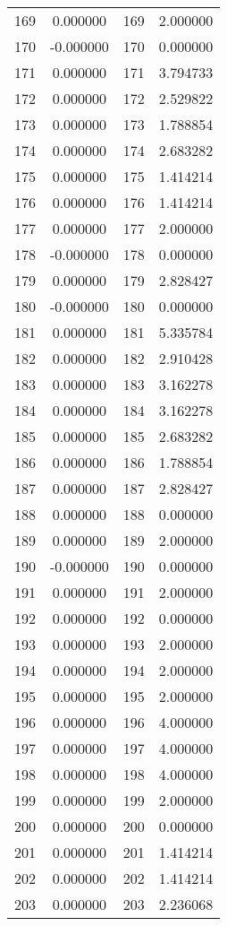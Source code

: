 \documentclass[12pt]{article}
\begin{document}
\begin{longtable}{@{}cccc@{}}
169 & 0.000000 & 169 & 2.000000 \\
170 & -0.000000 & 170 & 0.000000 \\
171 & 0.000000 & 171 & 3.794733 \\
172 & 0.000000 & 172 & 2.529822 \\
173 & 0.000000 & 173 & 1.788854 \\
174 & 0.000000 & 174 & 2.683282 \\
175 & 0.000000 & 175 & 1.414214 \\
176 & 0.000000 & 176 & 1.414214 \\
177 & 0.000000 & 177 & 2.000000 \\
178 & -0.000000 & 178 & 0.000000 \\
179 & 0.000000 & 179 & 2.828427 \\
180 & -0.000000 & 180 & 0.000000 \\
181 & 0.000000 & 181 & 5.335784 \\
182 & 0.000000 & 182 & 2.910428 \\
183 & 0.000000 & 183 & 3.162278 \\
184 & 0.000000 & 184 & 3.162278 \\
185 & 0.000000 & 185 & 2.683282 \\
186 & 0.000000 & 186 & 1.788854 \\
187 & 0.000000 & 187 & 2.828427 \\
188 & 0.000000 & 188 & 0.000000 \\
189 & 0.000000 & 189 & 2.000000 \\
190 & -0.000000 & 190 & 0.000000 \\
191 & 0.000000 & 191 & 2.000000 \\
192 & 0.000000 & 192 & 0.000000 \\
193 & 0.000000 & 193 & 2.000000 \\
194 & 0.000000 & 194 & 2.000000 \\
195 & 0.000000 & 195 & 2.000000 \\
196 & 0.000000 & 196 & 4.000000 \\
197 & 0.000000 & 197 & 4.000000 \\
198 & 0.000000 & 198 & 4.000000 \\
199 & 0.000000 & 199 & 2.000000 \\
200 & 0.000000 & 200 & 0.000000 \\
201 & 0.000000 & 201 & 1.414214 \\
202 & 0.000000 & 202 & 1.414214 \\
203 & 0.000000 & 203 & 2.236068 \\

\end{longtable}
\end{document}
